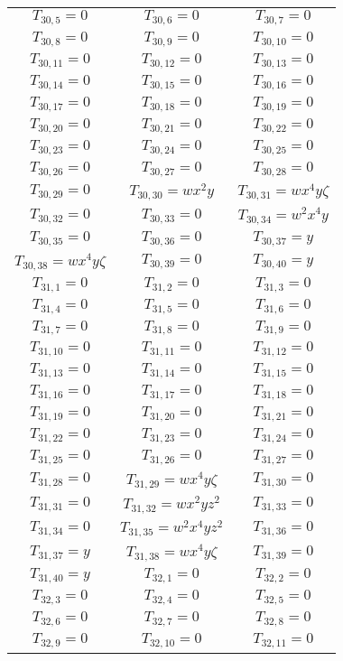 \begin{longtable}{|c|c|c|}
$T_{30,5}= 0$&
$T_{30,6}= 0$&
$T_{30,7}= 0$\\
$T_{30,8}= 0$&
$T_{30,9}= 0$&
$T_{30,10}= 0$\\
$T_{30,11}= 0$&
$T_{30,12}= 0$&
$T_{30,13}= 0$\\
$T_{30,14}= 0$&
$T_{30,15}= 0$&
$T_{30,16}= 0$\\
$T_{30,17}= 0$&
$T_{30,18}= 0$&
$T_{30,19}= 0$\\
$T_{30,20}= 0$&
$T_{30,21}= 0$&
$T_{30,22}= 0$\\
$T_{30,23}= 0$&
$T_{30,24}= 0$&
$T_{30,25}= 0$\\
$T_{30,26}= 0$&
$T_{30,27}= 0$&
$T_{30,28}= 0$\\
$T_{30,29}= 0$&
$T_{30,30}= wx^2y$&
$T_{30,31}= wx^4y\zeta$\\
$T_{30,32}= 0$&
$T_{30,33}= 0$&
$T_{30,34}= w^2x^4y$\\
$T_{30,35}= 0$&
$T_{30,36}= 0$&
$T_{30,37}= y$\\
$T_{30,38}= wx^4y\zeta$&
$T_{30,39}= 0$&
$T_{30,40}= y$\\
$T_{31,1}= 0$&
$T_{31,2}= 0$&
$T_{31,3}= 0$\\
$T_{31,4}= 0$&
$T_{31,5}= 0$&
$T_{31,6}= 0$\\
$T_{31,7}= 0$&
$T_{31,8}= 0$&
$T_{31,9}= 0$\\
$T_{31,10}= 0$&
$T_{31,11}= 0$&
$T_{31,12}= 0$\\
$T_{31,13}= 0$&
$T_{31,14}= 0$&
$T_{31,15}= 0$\\
$T_{31,16}= 0$&
$T_{31,17}= 0$&
$T_{31,18}= 0$\\
$T_{31,19}= 0$&
$T_{31,20}= 0$&
$T_{31,21}= 0$\\
$T_{31,22}= 0$&
$T_{31,23}= 0$&
$T_{31,24}= 0$\\
$T_{31,25}= 0$&
$T_{31,26}= 0$&
$T_{31,27}= 0$\\
$T_{31,28}= 0$&
$T_{31,29}= wx^4y\zeta$&
$T_{31,30}= 0$\\
$T_{31,31}= 0$&
$T_{31,32}= wx^2yz^2$&
$T_{31,33}= 0$\\
$T_{31,34}= 0$&
$T_{31,35}= w^2x^4yz^2$&
$T_{31,36}= 0$\\
$T_{31,37}= y$&
$T_{31,38}= wx^4y\zeta$&
$T_{31,39}= 0$\\
$T_{31,40}= y$&
$T_{32,1}= 0$&
$T_{32,2}= 0$\\
$T_{32,3}= 0$&
$T_{32,4}= 0$&
$T_{32,5}= 0$\\
$T_{32,6}= 0$&
$T_{32,7}= 0$&
$T_{32,8}= 0$\\
$T_{32,9}= 0$&
$T_{32,10}= 0$&
$T_{32,11}= 0$\\

\end{longtable}
